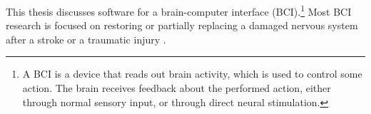 
\label{sec:BCI}

This thesis discusses software for a brain-computer interface (BCI).\footnote{A BCI is a device that reads out brain activity, which is used to control some action. The brain receives feedback about the performed action, either through normal sensory input, or through direct neural stimulation.}
Most BCI research is focused on restoring or partially replacing a damaged nervous system after a stroke or a traumatic injury \cite{Krucoff2016}.




